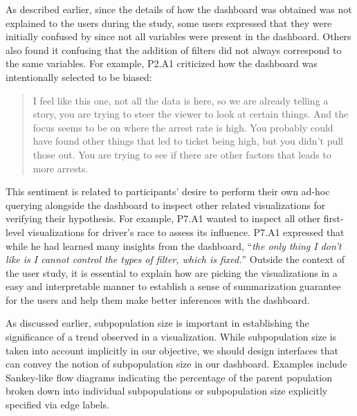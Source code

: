 \par As described earlier, since the details of how the dashboard was obtained was not explained to the users during the study, some users expressed that they were initially confused by \system since not all variables were present in the dashboard. Others also found it confusing that the addition of filters did not always correspond to the same variables. For example, P2.A1 criticized how the dashboard was intentionally selected to be biased:
\begin{quote}
I feel like this one, not all the data is here, so we are already telling a story, you are trying to steer the viewer to look at certain things. And the focus seems to be on where the arrest rate is high. You probably could have found other things that led to ticket being high, but you didn't pull those out. You are trying to see if there are other factors that leads to more arrests.
\end{quote}
\npar This sentiment is related to participants' desire to perform their own ad-hoc querying alongside the dashboard to inspect other related visualizations for verifying their hypothesis. For example, P7.A1 wanted to inspect all other first-level visualizations for driver's race to assess its influence. P7.A1 expressed that while he had learned many insights from the dashboard, ``\textit{the only thing I don't like is I cannot control the types of filter, which is fixed.}'' Outside the context of the user study, it is essential to explain how \system are picking the visualizations in a easy and interpretable manner to establish a sense of summarization guarantee for the users and help them make better inferences with the dashboard.
\par As discussed earlier, subpopulation size is important in establishing the significance of a trend observed in a visualization. While subpopulation size is taken into account implicitly in our objective, we should design interfaces that can convey the notion of subpopulation size in our dashboard. Examples include Sankey-like flow diagrams indicating the percentage of the parent population broken down into individual subpopulations or subpopulation size explicitly specified via edge labels.%
